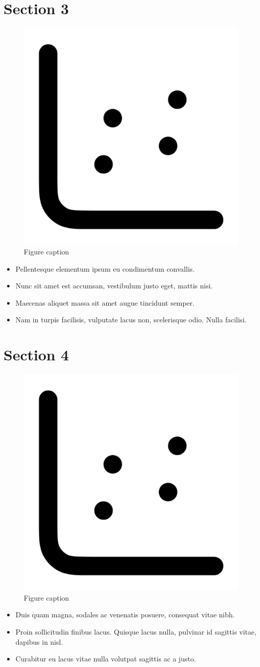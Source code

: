 \documentclass{tudelftposter}
\begin{document}
\vspace{-1cm}
\section{Section 3}
\begin{figure}[ht]
\centering
\includegraphics[width=0.4\columnwidth]{imgs/dummy_img.png}
\caption{Figure caption}
\label{fig:fig2}
\end{figure}
\begin{itemize}
\item Pellentesque elementum ipsum eu condimentum convallis. 
\item Nunc sit amet est accumsan, vestibulum justo eget, mattis nisi.
\item Maecenas aliquet massa sit amet augue tincidunt semper.
\item Nam in turpis facilisis, vulputate lacus non, scelerisque odio. Nulla facilisi.
\end{itemize}


\section{Section 4}
\begin{figure}[ht]
\centering
\includegraphics[width=0.5\columnwidth]{imgs/dummy_img.png}
\caption{Figure caption}
\label{fig:fig3}
\end{figure}
\begin{itemize}
\item Duis quam magna, sodales ac venenatis posuere, consequat vitae nibh.
\item Proin sollicitudin finibus lacus. Quisque lacus nulla, pulvinar id sagittis vitae, dapibus in nisl. 
\item Curabitur eu lacus vitae nulla volutpat sagittis ac a justo. 
\end{itemize}
\end{document}
